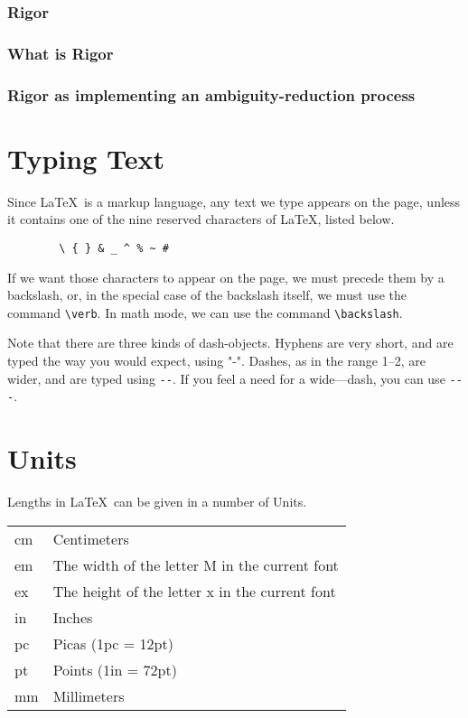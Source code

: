 \documentclass[UTF8]{article}
\begin{document}
	\subsubsection{Rigor}
	\subsubsection{What is Rigor}
	\subsubsection{Rigor as implementing an ambiguity-reduction process}
	
	
	\section{Typing Text}
	Since \LaTeX\ is a markup language, any text we
	type appears on the page, unless it contains
	one of the nine reserved characters of \LaTeX, listed
	below.
	\begin{verbatim}
		\ { } & _ ^ % ~ #
	\end{verbatim}
	If we want those characters to appear on the page, we
	must precede them by a backslash, or, in the special
	case of the backslash itself, we must use the 
	command \verb(\verb(.  In math mode, we can use the command
	\verb(\backslash(.
	
	Note that there are three kinds of dash-objects.  Hyphens 
	are very short, and are typed the way you would expect, using
	"-".  Dashes, as in the range 1--2, are wider, and are typed
	using \verb+--+.  If you feel a need for a wide---dash, you can
	use \verb+---+.
	
	\section{Units}
	Lengths in \LaTeX\ can be given in a number of Units.\\
	\begin{tabular}{ll}
		cm & Centimeters\\
		em & The width of the letter M in the current font\\
		ex & The height of the letter x in the current font\\
		in & Inches\\
		pc & Picas (1pc = 12pt)\\
		pt & Points (1in = 72pt)\\
		mm & Millimeters
	\end{tabular}
	
\end{document}
